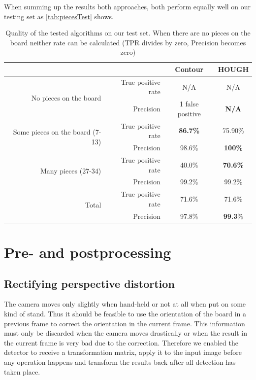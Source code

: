 	When summing up the results both approaches, both perform equally well on our testing set as \autoref{tab:piecesTest} shows.
	\begin{table}[bh]
		\begin{tabular}{|r|r||c|c|}
			\cline{3-4}
		    \multicolumn{2}{c|}{}											 		& Contour 	& HOUGH\\
			\cline{3-4}
			\hline
			\multirow{2}{*}{No pieces on the board}   		& True positive rate 	& N/A 		& N/A  \\
															& Precision			 	& 1 false positive 		& \bf{N/A} \\
			\hline
			\multirow{2}{*}{Some pieces on the board (7-13)}& True positive rate 	& \bf{86.7\%} 	& 75.90\% \\
															& Precision 			& 98.6\% 		& \bf{100\%} \\
			\hline
			\multirow{2}{*}{Many pieces (27-34)} 			& True positive rate 	& 40.0\% 		& \bf{70.6\%} \\
															& Precision			 	& 99.2\% 		& 99.2\% \\
			\hline
			\hline
			\multirow{2}{*}{Total}				 			& True positive rate 	& 71.6\% 		& 71.6\% \\
															& Precision			 	& 97.8\% 		& \textbf{99.3}\% \\
			\hline
		\end{tabular}
		\caption{Quality of the tested algorithms on our test set. When there are no pieces on the board neither rate can be calculated (TPR divides by zero, Precision becomes zero)}
		\label{tab:piecesTest}
	\end{table}


	\section{Pre- and postprocessing}
	\label{evaluation-prepostprocessing}

	\subsection{Rectifying perspective distortion}
	\label{evaluation-prepostprocessing-perspectiveRectifying}
	The camera moves only slightly when hand-held or not at all when put on some kind of stand. Thus it should be feasible to use the orientation of the board in a previous frame to correct the orientation in the current frame. This information must only be discarded when the camera moves drastically or when the result in the current frame is very bad due to the correction. Therefore we enabled the detector to receive a transformation matrix, apply it to the input image before any operation happens and transform the results back after all detection has taken place.

